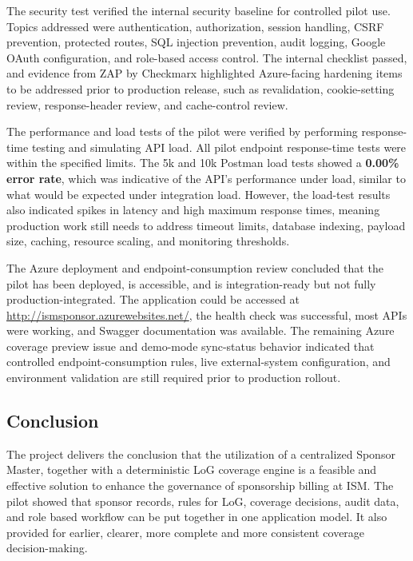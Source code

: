 The security test verified the internal security baseline for controlled pilot use. Topics addressed were authentication, authorization, session handling, CSRF prevention, protected routes, SQL injection prevention, audit logging, Google OAuth configuration, and role-based access control. The internal checklist passed, and evidence from ZAP by Checkmarx highlighted Azure-facing hardening items to be addressed prior to production release, such as revalidation, cookie-setting review, response-header review, and cache-control review.

The performance and load tests of the pilot were verified by performing response-time testing and simulating API load. All pilot endpoint response-time tests were within the specified limits. The 5k and 10k Postman load tests showed a \textbf{0.00\% error rate}, which was indicative of the API's performance under load, similar to what would be expected under integration load. However, the load-test results also indicated spikes in latency and high maximum response times, meaning production work still needs to address timeout limits, database indexing, payload size, caching, resource scaling, and monitoring thresholds.

The Azure deployment and endpoint-consumption review concluded that the pilot has been deployed, is accessible, and is integration-ready but not fully production-integrated. The application could be accessed at \url{http://ismsponsor.azurewebsites.net/}, the health check was successful, most APIs were working, and Swagger documentation was available. The remaining Azure coverage preview issue and demo-mode sync-status behavior indicated that controlled endpoint-consumption rules, live external-system configuration, and environment validation are still required prior to production rollout.

\subsection{Conclusion}

The project delivers the conclusion that the utilization of a centralized Sponsor Master, together with a deterministic LoG coverage engine is a feasible and effective solution to enhance the governance of sponsorship billing at ISM. The pilot showed that sponsor records, rules for LoG, coverage decisions, audit data, and role based workflow can be put together in one application model. It also provided for earlier, clearer, more complete and more consistent coverage decision-making.

